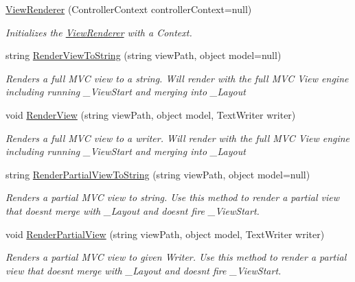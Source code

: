 \begin{DoxyCompactItemize}
\item 
\hyperlink{class_open_1_1_g_i_1_1hypermart_1_1_helpers_1_1_view_renderer_aabe19f0b091fc4a5a2dbef6c898eaef4}{View\+Renderer} (Controller\+Context controller\+Context=null)
\begin{DoxyCompactList}\small\item\em Initializes the \hyperlink{class_open_1_1_g_i_1_1hypermart_1_1_helpers_1_1_view_renderer}{View\+Renderer} with a Context. \end{DoxyCompactList}\item 
string \hyperlink{class_open_1_1_g_i_1_1hypermart_1_1_helpers_1_1_view_renderer_af8383dd6d43af50ba6433ea8fa9c03f2}{Render\+View\+To\+String} (string view\+Path, object model=null)
\begin{DoxyCompactList}\small\item\em Renders a full M\+VC view to a string. Will render with the full M\+VC View engine including running \+\_\+\+View\+Start and merging into \+\_\+\+Layout \end{DoxyCompactList}\item 
void \hyperlink{class_open_1_1_g_i_1_1hypermart_1_1_helpers_1_1_view_renderer_af04c462b2dc2f610f0442f8d5718055a}{Render\+View} (string view\+Path, object model, Text\+Writer writer)
\begin{DoxyCompactList}\small\item\em Renders a full M\+VC view to a writer. Will render with the full M\+VC View engine including running \+\_\+\+View\+Start and merging into \+\_\+\+Layout \end{DoxyCompactList}\item 
string \hyperlink{class_open_1_1_g_i_1_1hypermart_1_1_helpers_1_1_view_renderer_a2afbe1ea2ffd68f08dcd28309fd42744}{Render\+Partial\+View\+To\+String} (string view\+Path, object model=null)
\begin{DoxyCompactList}\small\item\em Renders a partial M\+VC view to string. Use this method to render a partial view that doesn\textquotesingle{}t merge with \+\_\+\+Layout and doesn\textquotesingle{}t fire \+\_\+\+View\+Start. \end{DoxyCompactList}\item 
void \hyperlink{class_open_1_1_g_i_1_1hypermart_1_1_helpers_1_1_view_renderer_af41730f2378765d4eacaae51b661ed45}{Render\+Partial\+View} (string view\+Path, object model, Text\+Writer writer)
\begin{DoxyCompactList}\small\item\em Renders a partial M\+VC view to given Writer. Use this method to render a partial view that doesn\textquotesingle{}t merge with \+\_\+\+Layout and doesn\textquotesingle{}t fire \+\_\+\+View\+Start. \end{DoxyCompactList}\end{DoxyCompactItemize}
